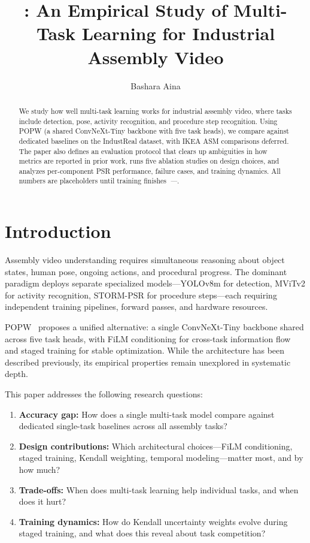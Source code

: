 \documentclass[10pt,journal,compsoc]{IEEEtran}
\title{\popwa{}: An Empirical Study of Multi-Task Learning for Industrial Assembly Video}
\author{Bashara Aina}
\newcommand{\popw}{POPW}
\newcommand{\todo}{\textit{---}}
\newcommand{\popwres}{\todo}
\begin{document}
\maketitle

\begin{abstract}
We study how well multi-task learning works for industrial assembly video, where tasks include detection, pose, activity recognition, and procedure step recognition. Using \popw{} (a shared ConvNeXt-Tiny backbone with five task heads), we compare against dedicated baselines on the IndustReal dataset, with IKEA ASM comparisons deferred. The paper also defines an evaluation protocol that clears up ambiguities in how metrics are reported in prior work, runs five ablation studies on design choices, and analyzes per-component PSR performance, failure cases, and training dynamics. All numbers are placeholders until training finishes~\popwres.
\end{abstract}

\FloatBarrier

\section{Introduction}
\label{sec:intro}

Assembly video understanding requires simultaneous reasoning about object states, human pose, ongoing actions, and procedural progress. The dominant paradigm deploys separate specialized models---YOLOv8m for detection, MViTv2 for activity recognition, STORM-PSR for procedure steps---each requiring independent training pipelines, forward passes, and hardware resources.

\popw{}~\cite{popw2026} proposes a unified alternative: a single ConvNeXt-Tiny backbone shared across five task heads, with FiLM conditioning for cross-task information flow and staged training for stable optimization. While the architecture has been described previously, its empirical properties remain unexplored in systematic depth.

This paper addresses the following research questions:
\begin{enumerate}[nosep]
\item \textbf{Accuracy gap:} How does a single multi-task model compare against dedicated single-task baselines across all assembly tasks?
\item \textbf{Design contributions:} Which architectural choices---FiLM conditioning, staged training, Kendall weighting, temporal modeling---matter most, and by how much?
\item \textbf{Trade-offs:} When does multi-task learning help individual tasks, and when does it hurt?
\item \textbf{Training dynamics:} How do Kendall uncertainty weights evolve during staged training, and what does this reveal about task competition?
\end{enumerate}
\end{document}
